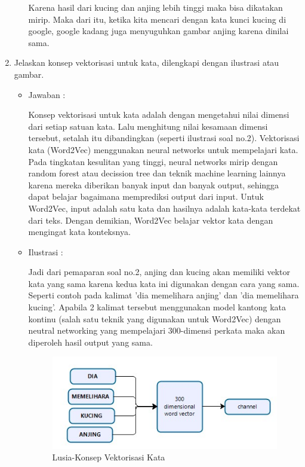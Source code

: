 \begin{enumerate}
\begin{itemize}
		\par Karena hasil dari kucing dan anjing lebih tinggi maka bisa dikatakan  mirip. Maka dari itu, ketika kita mencari dengan kata kunci kucing di google, google kadang juga menyuguhkan gambar anjing karena dinilai sama.
	\end{itemize}

\item Jelaskan konsep vektorisasi untuk kata, dilengkapi dengan ilustrasi atau gambar.
	\begin{itemize}
	\item Jawaban :
		\par Konsep vektorisasi untuk kata adalah dengan mengetahui nilai dimensi dari setiap satuan kata. Lalu menghitung nilai kesamaan dimensi tersebut, setalah itu dibandingkan (seperti ilustrasi soal no.2). Vektorisasi kata (Word2Vec) menggunakan neural networks untuk mempelajari kata. Pada tingkatan kesulitan yang tinggi, neural networks mirip dengan random forest atau decission tree dan teknik machine learning lainnya karena mereka diberikan banyak input dan banyak output, sehingga dapat belajar bagaimana memprediksi output dari input. Untuk Word2Vec, input adalah satu kata dan hasilnya adalah kata-kata terdekat dari teks. Dengan demikian, Word2Vec belajar vektor kata dengan mengingat kata konteksnya.
	\item Ilustrasi :
		\par Jadi dari pemaparan soal no.2, anjing dan kucing akan memiliki vektor kata yang sama karena kedua kata ini digunakan dengan cara yang sama. Seperti contoh pada kalimat 'dia memelihara anjing' dan 'dia memelihara kucing'. Apabila 2 kalimat tersebut menggunakan model kantong kata kontinu (salah satu teknik yang digunakan untuk Word2Vec) dengan neutral networking yang mempelajari 300-dimensi perkata maka akan diperoleh hasil output yang sama.
			\begin{figure}[ht]
			\centering
			\includegraphics[scale=0.5]{figures/p3.jpg}
			\caption{Lusia-Konsep Vektorisasi Kata}
			\label{contoh}
			\end{figure}
	\end{itemize}


\end{enumerate}
